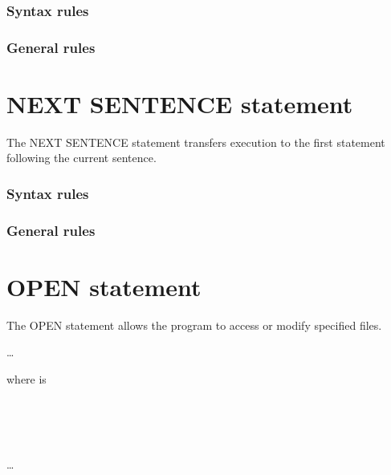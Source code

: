 \subsubsection{Syntax rules}

\subsubsection{General rules}

\section{NEXT SENTENCE statement}

The NEXT SENTENCE statement transfers execution to the first statement following the current sentence.

\begin{syntax}[\archaiccolour]
     
\end{syntax}

\subsubsection{Syntax rules}

\subsubsection{General rules}

\section{OPEN statement}

The OPEN statement allows the program to access or modify specified files.

\begin{syntax}
  \begin{1=}
  \end{1=}\ldots
\end{syntax}

where  is

\begin{syntax}
  \begin{1=}
     \\
     \\
     \\
  \end{1=}
  \begin{0-1}
  \end{0-1}
  \begin{0-1}
  \end{0-1}
  \begin{1=}
    \filename
  \end{1=}\ldots
  \begin{0-1}
  \end{0-1}
\end{syntax}

